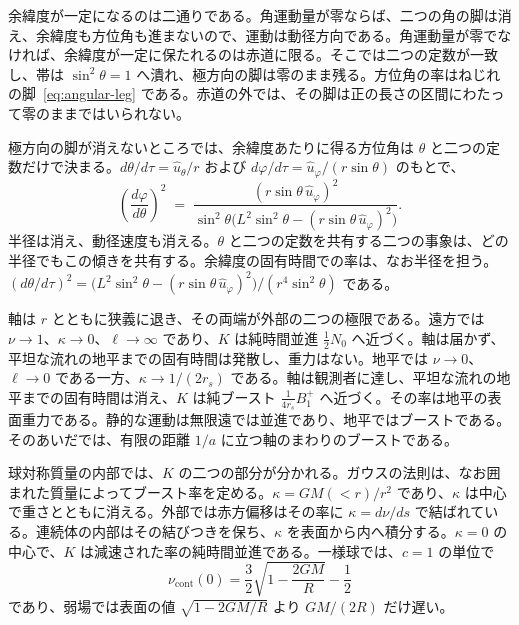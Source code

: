 \documentclass[a4paper]{article}
\begin{document}
余緯度が一定になるのは二通りである。角運動量が零ならば、二つの角の脚は消え、余緯度も方位角も進まないので、運動は動径方向である。角運動量が零でなければ、余緯度が一定に保たれるのは赤道に限る。そこでは二つの定数が一致し、帯は \(\sin^{2}\theta=1\) へ潰れ、極方向の脚は零のまま残る。方位角の率はねじれの脚~\eqref{eq:angular-leg} である。赤道の外では、その脚は正の長さの区間にわたって零のままではいられない。

極方向の脚が消えないところでは、余緯度あたりに得る方位角は \(\theta\) と二つの定数だけで決まる。\(d\theta/d\tau=\hat{u}_{\theta}/r\) および \(d\varphi/d\tau=\hat{u}_{\varphi}/(r\sin\theta)\) のもとで、
\begin{equation}
\left(\frac{d\varphi}{d\theta}\right)^{2}
\;=\;
\frac{(r\sin\theta\,\hat{u}_{\varphi})^{2}}{\sin^{2}\theta\bigl(L^{2}\sin^{2}\theta-(r\sin\theta\,\hat{u}_{\varphi})^{2}\bigr)}.
\label{eq:azimuth-slope}
\end{equation}
半径は消え、動径速度も消える。\(\theta\) と二つの定数を共有する二つの事象は、どの半径でもこの傾きを共有する。余緯度の固有時間での率は、なお半径を担う。\((d\theta/d\tau)^{2}=\bigl(L^{2}\sin^{2}\theta-(r\sin\theta\,\hat{u}_{\varphi})^{2}\bigr)/(r^{4}\sin^{2}\theta)\) である。

軸は \(r\) とともに狭義に退き、その両端が外部の二つの極限である。遠方では \(\nu\to 1\)、\(\kappa\to 0\)、\(\ell\to\infty\) であり、\(K\) は純時間並進 \(\tfrac12 N_{0}\) へ近づく。軸は届かず、平坦な流れの地平までの固有時間は発散し、重力はない。地平では \(\nu\to 0\)、\(\ell\to 0\) である一方、\(\kappa\to 1/(2r_{s})\) である。軸は観測者に達し、平坦な流れの地平までの固有時間は消え、\(K\) は純ブースト \(\tfrac{1}{4r_{s}}B^{+}_{1}\) へ近づく。その率は地平の表面重力である。静的な運動は無限遠では並進であり、地平ではブーストである。そのあいだでは、有限の距離 \(1/a\) に立つ軸のまわりのブーストである。

球対称質量の内部では、\(K\) の二つの部分が分かれる。ガウスの法則は、なお囲まれた質量によってブースト率を定める。\(\kappa=GM(<r)/r^{2}\) であり、\(\kappa\) は中心で重さとともに消える。外部では赤方偏移はその率に \(\kappa=d\nu/ds\) で結ばれている。連続体の内部はその結びつきを保ち、\(\kappa\) を表面から内へ積分する。\(\kappa=0\) の中心で、\(K\) は減速された率の純時間並進である。一様球では、\(c=1\) の単位で
\[
\nu_{\mathrm{cont}}(0)
=\frac32\sqrt{1-\frac{2GM}{R}}-\frac12
\]
であり、弱場では表面の値 \(\sqrt{1-2GM/R}\) より \(GM/(2R)\) だけ遅い。
\end{document}
